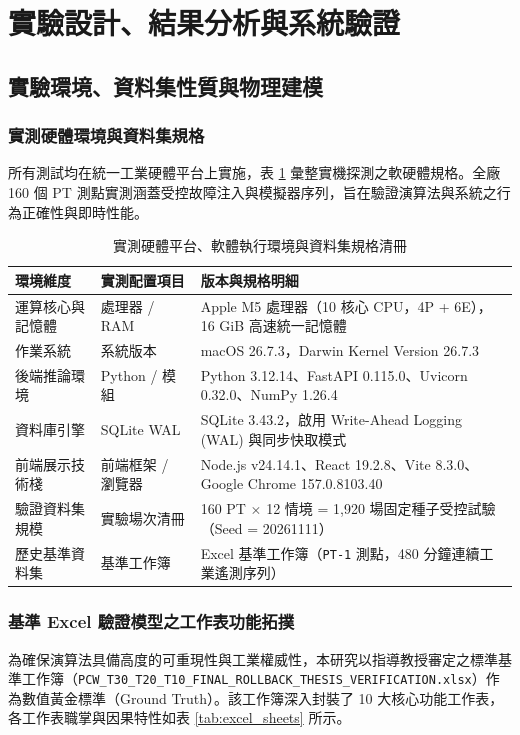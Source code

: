 \documentclass[fontset=none, a4paper, 12pt]{ctexart}
\begin{document}
\section{實驗設計、結果分析與系統驗證}

\subsection{實驗環境、資料集性質與物理建模}

\subsubsection{實測硬體環境與資料集規格}
所有測試均在統一工業硬體平台上實施，表 \ref{tab:hardware_specs} 彙整實機探測之軟硬體規格。全廠 160 個 PT 測點實測涵蓋受控故障注入與模擬器序列，旨在驗證演算法與系統之行為正確性與即時性能。

\begin{table}[H]
    \centering
    \caption{實測硬體平台、軟體執行環境與資料集規格清冊}
    \label{tab:hardware_specs}
    \small
    \begin{tabularx}{\textwidth}{llX}
        \toprule
        \textbf{環境維度} & \textbf{實測配置項目} & \textbf{版本與規格明細} \\
        \midrule
        運算核心與記憶體 & 處理器 / RAM & Apple M5 處理器（10 核心 CPU，4P + 6E），16 GiB 高速統一記憶體 \\
        作業系統 & 系統版本 & macOS 26.7.3，Darwin Kernel Version 26.7.3 \\
        後端推論環境 & Python / 模組 & Python 3.12.14、FastAPI 0.115.0、Uvicorn 0.32.0、NumPy 1.26.4 \\
        資料庫引擎 & SQLite WAL & SQLite 3.43.2，啟用 Write-Ahead Logging (WAL) 與同步快取模式 \\
        前端展示技術棧 & 前端框架 / 瀏覽器 & Node.js v24.14.1、React 19.2.8、Vite 8.3.0、Google Chrome 157.0.8103.40 \\
        驗證資料集規模 & 實驗場次清冊 & 160 PT $\times$ 12 情境 = 1,920 場固定種子受控試驗（Seed = 20261111） \\
        歷史基準資料集 & 基準工作簿 & Excel 基準工作簿（\texttt{PT-1} 測點，480 分鐘連續工業遙測序列） \\
        \bottomrule
    \end{tabularx}
\end{table}

\subsubsection{基準 Excel 驗證模型之工作表功能拓撲}
為確保演算法具備高度的可重現性與工業權威性，本研究以指導教授審定之標準基準工作簿（\texttt{PCW\_T30\_T20\_T10\_FINAL\_ROLLBACK\_THESIS\_VERIFICATION.xlsx}）作為數值黃金標準（Ground Truth）。該工作簿深入封裝了 10 大核心功能工作表，各工作表職掌與因果特性如表 \ref{tab:excel_sheets} 所示。
\end{document}
